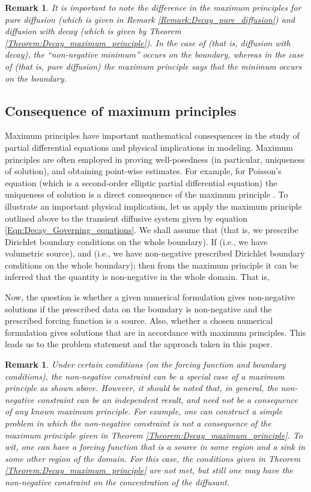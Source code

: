 \documentclass[11pt]{amsart}
\newtheorem{remark}[theorem]{Remark}
\begin{document}
\begin{remark}
  It is important to note the difference in the maximum principles for pure diffusion 
  (which is given in Remark \ref{Remark:Decay_pure_diffusion}) and diffusion with decay 
  (which is given by Theorem \ref{Theorem:Decay_maximum_principle}). In the case of 
   (that is, diffusion with decay), the ``\emph{non-negative 
    minimum}'' occurs on the boundary, whereas in the case of  
  (that is, pure diffusion) the maximum principle says that the minimum occurs on the 
  boundary. 
\end{remark}

\subsection{Consequence of maximum principles}
Maximum principles have important mathematical consequences in the study of partial differential 
equations and physical implications in modeling. Maximum principles are often employed in proving 
well-posedness (in particular, uniqueness of solution), and obtaining point-wise estimates. For 
example, for Poisson's equation (which is a second-order elliptic partial differential equation) 
the uniqueness of solution is a direct consequence of the maximum principle \cite{McOwen}. 
To illustrate an important physical implication, let us apply the maximum principle outlined above 
to the transient diffusive system given by equation \eqref{Eqn:Decay_Governing_equations}. We shall 
assume that  (that is, we prescribe Dirichlet boundary conditions 
on the whole boundary). If  (i.e., we have volumetric source), and  (i.e., we have non-negative prescribed Dirichlet boundary conditions on the whole 
boundary); then from the maximum principle it can be inferred that the quantity  is 
non-negative in the whole domain. That is, 

Now, the question is whether a given numerical formulation gives non-negative solutions if 
the prescribed data on the boundary is non-negative and the prescribed forcing function is 
a source. Also, whether a chosen numerical formulation gives solutions that are in accordance 
with maximum principles. This leads us to the problem statement and the approach taken in this paper. 

\begin{remark}
  Under certain conditions (on the forcing function and boundary conditions), the non-negative 
  constraint can be a special case of a maximum principle as shown above. However, it should 
  be noted that, in general, the non-negative constraint can be an independent result, and need 
  not be a consequence of any known maximum principle. For example, one can construct a 
  simple problem in which the non-negative constraint is not a consequence of the maximum 
  principle given in Theorem \ref{Theorem:Decay_maximum_principle}. To wit, one can have 
  a forcing function that is a source in some region and a sink in some other region of 
  the domain. For this case, the conditions given in Theorem \ref{Theorem:Decay_maximum_principle} 
  are not met, but still one may have the non-negative constraint on the concentration of the 
  diffusant. 
\end{remark}
\end{document}
